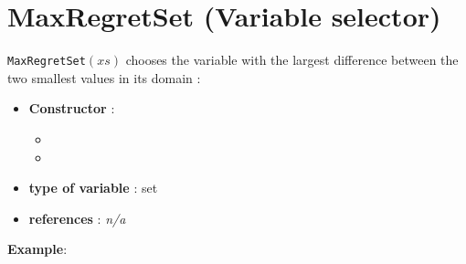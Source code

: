 \section{MaxRegretSet (Variable selector)}\label{maxregretset:maxregretsetvarselector}\hypertarget{maxregretset:maxregretsetvarselector}{}
\begin{notedef}
  \texttt{MaxRegretSet}$(xs)$ chooses the variable with the largest difference between the two smallest values in its domain :
\end{notedef}

\begin{itemize}
	\item \textbf{Constructor} : 
	\begin{itemize}
	\item {}
	\item {}
	\end{itemize}	
	\item \textbf{type of variable} : set
	\item \textbf{references} : \emph{n/a}
\end{itemize}

\textbf{Example}:
%

